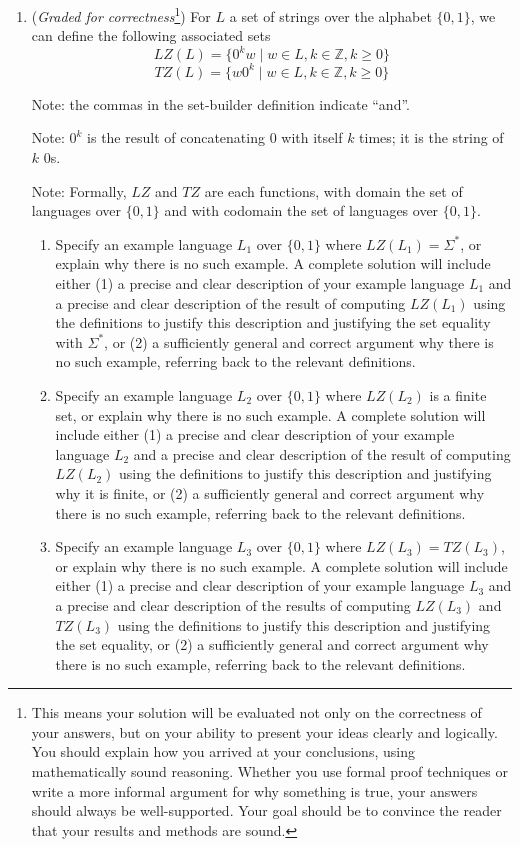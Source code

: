 \documentclass[12pt, oneside]{article}
\begin{document}
\begin{enumerate}
\item ({\it Graded for correctness}\footnote{This means your solution will be
evaluated not only on the correctness of your answers, but on your ability to 
present your ideas clearly and logically. You should explain how you arrived at 
your conclusions, using 
mathematically sound reasoning. Whether you use formal proof techniques or 
write a more informal argument for why 
something is true, your answers should always be well-supported. Your goal 
should be to convince the reader that 
your results and methods are sound.}) 
For $L$ a set of strings over the alphabet $\{0,1\}$, we can define the following associated sets
\[
LZ(L) = \{ 0^k w \mid w \in L, k \in \mathbb{Z}, k \geq 0 \}
\]
\[
TZ(L) = \{ w 0^k \mid w \in L, k \in \mathbb{Z}, k \geq 0 \}
\]

Note: the commas in the set-builder definition indicate ``and''.

Note: $0^k$ is the result of concatenating $0$ with itself $k$ times; it is the string of $k$ $0$s.

Note: Formally, $LZ$ and $TZ$ are each functions, with domain the set of languages over $\{0,1\}$ and with codomain 
the set of languages over $\{0,1\}$.

\begin{enumerate}
\item Specify an example language $L_1$ over $\{0,1\}$ where $LZ(L_1) = \Sigma^*$, or explain why there is no such 
example. A complete solution will include either (1) a precise and clear 
description of your example language $L_1$ and a precise and clear description of the result of computing $LZ(L_1)$
using the definitions to justify this description and justifying the set equality with $\Sigma^*$, or (2) a sufficiently
general and correct argument why there is no such example, referring back to the relevant definitions.
\item Specify an example language $L_2$ over $\{0,1\}$ where $LZ(L_2)$ is a finite set, or explain why there is no such 
example. A complete solution will include either (1) a precise and clear 
description of your example language $L_2$ and a precise and clear description of the result of computing $LZ(L_2)$
using the definitions to justify this description and justifying why it is finite, or (2) a sufficiently
general and correct argument why there is no such example, referring back to the relevant definitions.
\item Specify an example language $L_3$ over $\{0,1\}$ where $LZ(L_3) = TZ(L_3)$, or explain why there is no such 
example. A complete solution will include either (1) a precise and clear 
description of your example language $L_3$ and a precise and clear description of the results of computing $LZ(L_3)$
and $TZ(L_3)$ using the definitions to justify this description and justifying the set equality, or (2) a sufficiently
general and correct argument why there is no such example, referring back to the relevant definitions.
\end{enumerate}


\end{enumerate}
\end{document}
